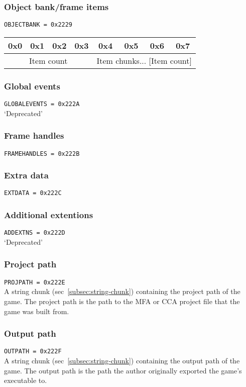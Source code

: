 \documentclass{article}
\begin{document}
\subsubsection{Object bank/frame items}
\verb|OBJECTBANK = 0x2229|
\\
\begin{tabular}{c|c|c|c|c|c|c|c}
  0x0 & 0x1 & 0x2 & 0x3 & 0x4 & 0x5 & 0x6 & 0x7
  \\ \hline
  \multicolumn{4}{|c|}{Item count} &
  \multicolumn{4}{|c}{Item chunks... [Item count]}
  \\ \hline
\end{tabular}


\subsubsection{Global events}
\verb|GLOBALEVENTS = 0x222A|
\\
`Deprecated'

\subsubsection{Frame handles}
\verb|FRAMEHANDLES = 0x222B|

\subsubsection{Extra data}
\verb|EXTDATA = 0x222C|

\subsubsection{Additional extentions}
\verb|ADDEXTNS = 0x222D|
\\
`Deprecated'

\subsubsection{Project path}
\verb|PROJPATH = 0x222E|
\\
A string chunk (sec~\ref{subsec:string-chunk}) containing the project path of
the game.
The project path is the path to the MFA or CCA project file that the game was
built from.

\subsubsection{Output path}
\verb|OUTPATH = 0x222F|
\\
A string chunk (sec~\ref{subsec:string-chunk}) containing the output path of
the game.
The output path is the path the author originally exported the game's
executable to.
\end{document}

